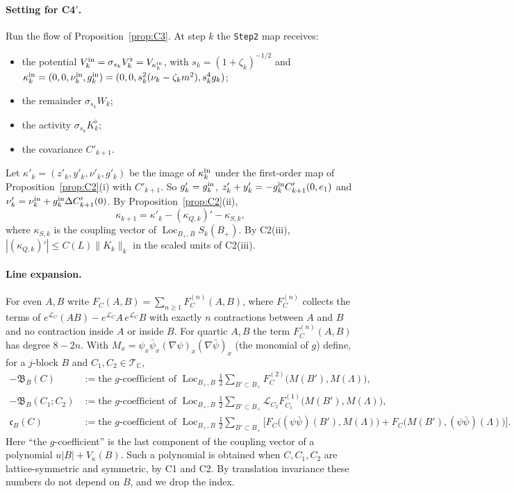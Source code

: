 \documentclass[11pt]{amsart}
\theoremstyle{definition}
\theoremstyle{remark}
\numberwithin{equation}{section}
\newcommand{\C}{\mathbb{C}}
\newcommand{\cL}{\mathcal{L}}
\newcommand{\cT}{\mathcal{T}}
\newcommand{\Loc}{\operatorname{Loc}}
\begin{document}
\paragraph{Setting for C4$'$.}
Run the flow of Proposition~\ref{prop:C3}. At step $k$ the \texttt{Step2} map receives:
\begin{itemize}
\item the potential $V^{\rm in}_k=\sigma_{s_k}V^\flat_k=V_{\kappa^{\rm in}_k}$, with
  $s_k=(1+\zeta_k)^{-1/2}$ and
  $\kappa^{\rm in}_k=(0,0,\nu^{\rm in}_k,g^{\rm in}_k)=(0,0,s_k^2(\nu_k-\zeta_km^2),s_k^4g_k)$;
\item the remainder $\sigma_{s_k}W_k$;
\item the activity $\sigma_{s_k}K^\flat_k$;
\item the covariance $C'_{k+1}$.
\end{itemize}
Let $\kappa'_k=(z'_k,y'_k,\nu'_k,g'_k)$ be the image of $\kappa^{\rm in}_k$ under the first-order
map of Proposition~\ref{prop:C2}(i) with $C'_{k+1}$. So $g'_k=g^{\rm in}_k$,
$z'_k+y'_k=-g^{\rm in}_kC'_{k+1}(0,e_1)$ and $\nu'_k=\nu^{\rm in}_k+g^{\rm in}_k\Delta C'_{k+1}(0)$.
By Proposition~\ref{prop:C2}(ii),
\begin{equation}\label{e:kappa-exact}
  \kappa_{k+1}=\kappa'_k-(\kappa_{Q,k})'-\kappa_{S,k},
\end{equation}
where $\kappa_{S,k}$ is the coupling vector of $\Loc_{B_+,B}S_k(B_+)$. By C2(iii),
$|(\kappa_{Q,k})'|\le C(L)\|K_k\|_k$ in the scaled units of C2(iii).

\paragraph{Line expansion.}
For even $A,B$ write $F_C(A,B)=\sum_{n\ge1}F^{(n)}_C(A,B)$, where $F^{(n)}_C$ collects the terms of
$e^{\cL_C}(AB)-e^{\cL_C}A\,e^{\cL_C}B$ with exactly $n$ contractions between $A$ and $B$ and no
contraction inside $A$ or inside $B$. For quartic $A,B$ the term $F^{(n)}_C(A,B)$ has degree
$8-2n$. With $M_x=\psi_x\bar\psi_x(\nabla\psi)_x(\nabla\bar\psi)_x$ (the monomial of $g$) define, for
a $j$-block $B$ and $C_1,C_2\in\cT_\C$,
\begin{align*}
  -\mathfrak B_B(C)&:=\text{the $g$-coefficient of }
    \Loc_{B_+,B}\tfrac12\textstyle\sum_{B'\subset B_+}F^{(2)}_C\bigl(M(B'),M(\Lambda)\bigr),\\
  -\mathfrak B_B(C_1;C_2)&:=\text{the $g$-coefficient of }
    \Loc_{B_+,B}\tfrac12\textstyle\sum_{B'\subset B_+}\cL_{C_2}F^{(1)}_{C_1}\bigl(M(B'),M(\Lambda)\bigr),\\
  \mathfrak c_B(C)&:=\text{the $g$-coefficient of }
    \Loc_{B_+,B}\tfrac12\textstyle\sum_{B'\subset B_+}\bigl[F_C\bigl((\psi\bar\psi)(B'),M(\Lambda)\bigr)
    +F_C\bigl(M(B'),(\psi\bar\psi)(\Lambda)\bigr)\bigr].
\end{align*}
Here ``the $g$-coefficient'' is the last component of the coupling vector of a polynomial
$u|B|+V_\kappa(B)$. Such a polynomial is obtained when $C,C_1,C_2$ are lattice-symmetric and
symmetric, by C1 and C2. By translation invariance these numbers do not depend on $B$, and we drop
the index.
\end{document}
